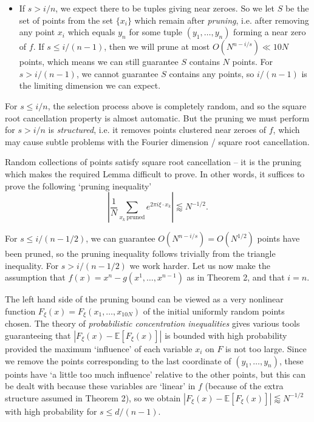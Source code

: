 \documentclass[12pt]{article}
\numberwithin{equation}{section}
\theoremstyle{plain}
\theoremstyle{remark}
\newcommand{\newpart}[1]
{\colorbox[rgb]{0.97,0.92,0.7}{\makebox[0.97\columnwidth]
{\rule[-1.2ex]{0pt}{3.7ex}\partfont{#1}}}\bigskip}
\newcommand{\partfont}[1]{{\LARGE \textsf{\textbf{#1}}}}
\begin{document}
{{\begin{multicols}{2}
{\begin{itemize}
    \item If $s > i/n$, we expect there to be tuples giving near zeroes. So we let $S$ be the set of points from the set $\{ x_i \}$ which remain after \emph{pruning}, i.e. after removing any point $x_i$ which equals $y_n$ for some tuple $(y_1,\dots,y_n)$ forming a near zero of $f$. If $s \leq i/(n-1)$, then we will prune at most $O(N^{n-i/s}) \ll 10 N$ points, which means we can still guarantee $S$ contains $N$ points. For $s > i/(n-1)$, we cannot guarantee $S$ contains any points, so $i/(n-1)$ is the limiting dimension we can expect.
\end{itemize}
%
For $s \leq i/n$, the selection process above is completely random, and so the square root cancellation property is almost automatic. But the pruning we must perform for $s > i/n$ is \emph{structured}, i.e. it removes points clustered near zeroes of $f$, which may cause subtle problems with the Fourier dimension / square root cancellation.

}



\columnbreak

\newpart{Dealing With Pruning}

\large{
Random collections of points satisfy square root cancellation -- it is the pruning which makes the required Lemma difficult to prove. In other words, it suffices to prove the following `pruning inequality'
    \[ \left| \frac{1}{N} \sum_{x_k\ \text{pruned}} e^{2 \pi i \xi \cdot x_k} \right| \lessapprox N^{-1/2}. \]

\vspace{0.1cm}

For $s \leq i/(n-1/2)$, we can guarantee $O(N^{n-i/s}) = O(N^{1/2})$ points have been pruned, so the pruning inequality follows trivially from the triangle inequality. For $s > i/(n-1/2)$ we work harder. Let us now make the assumption that $f(x) = x^n - g(x^1,\dots,x^{n-1})$ as in Theorem 2, and that $i = n$.

\vspace{0.1cm}

The left hand side of the pruning bound can be viewed as a very nonlinear function $F_\xi(x) = F_\xi(x_1,\dots,x_{10N})$ of the initial uniformly random points chosen. The theory of \emph{probabilistic concentration inequalities} gives various tools guaranteeing that $|F_\xi(x) - \mathbb{E}[F_\xi(x)]|$ is bounded with high probability provided the maximum `influence' of each variable $x_i$ on $F$ is not too large. Since we remove the points corresponding to the last coordinate of $(y_1,\dots,y_n)$, these points have `a little too much influence' relative to the other points, but this can be dealt with because these variables are `linear' in $f$ (because of the extra structure assumed in Theorem 2), so we obtain $|F_\xi(x) - \mathbb{E}[F_\xi(x)]| \lessapprox N^{-1/2}$ with high probability for $s \leq d/(n-1)$.

}
\end{multicols}}}
\end{document}
